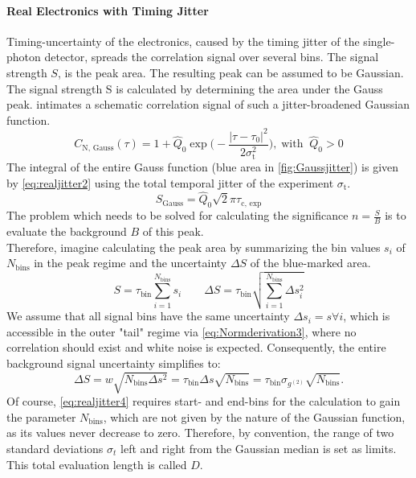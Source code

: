 \paragraph{Real Electronics with Timing Jitter}
Timing-uncertainty of the electronics, caused by the timing jitter of the single-photon detector, spreads the correlation signal over several bins. The signal strength $S$, is the peak area. The resulting peak can be assumed to be Gaussian. The signal strength S is calculated by determining the area under the Gauss peak.  intimates a schematic correlation signal of such a jitter-broadened Gaussian function.
\begin{equation}\label{eq:realjitter1}
	C_\mathrm{N,\, Gauss}(\tau) = 1+\hat{Q}_0\exp\Big(-\dfrac{|\tau-\tau_0|^2}{2\sigma^2_\mathrm{t}}\Big),\;\textrm{with}\;\;\hat{Q}_0>0
\end{equation}
The integral of the entire Gauss function (blue area in \cref{fig:Gaussjitter}) is given by \cref{eq:realjitter2} using the total temporal jitter of the experiment $\sigma_\mathrm{t}$.
\begin{equation}\label{eq:realjitter2}
	S_\mathrm{Gauss} =\hat{Q}_0\sqrt{2}\pi\tau_\mathrm{c,\, exp}
\end{equation}
The problem which needs to be solved for calculating the significance $n=\frac{S}{B}$ is to evaluate the background $B$ of this peak.\\
Therefore, imagine calculating the peak area by summarizing the bin values $s_i$ of $N_\mathrm{bins}$ in the peak regime and the uncertainty $\Delta S$ of the blue-marked area.
\begin{equation}\label{eq:realjitter3}
	S=\tau_\mathrm{bin}\sum_{i=1}^{N_\mathrm{bins}}s_i\qquad \Delta S=\tau_\mathrm{bin}\sqrt{\sum_{i=1}^{N_\mathrm{bins}}\Delta s^2_i}
\end{equation}
We assume that all signal bins have the same uncertainty $\Delta s_i = s\forall i$, which is accessible in the outer "tail" regime via \cref{eq:Normderivation3}, where no correlation should exist and white noise is expected. Consequently, the entire background signal uncertainty simplifies to:
\begin{equation}\label{eq:realjitter4}
	\Delta S=w\sqrt{N_\mathrm{bins}\Delta s^2}=\tau_\mathrm{bin}\Delta s\sqrt{N_\mathrm{bins}}=\tau_\mathrm{bin}\sigma_{g^{(2)}}\sqrt{N_\mathrm{bins}}.
\end{equation}
Of course, \cref{eq:realjitter4} requires start- and end-bins for the calculation to gain the parameter $N_\mathrm{bins}$, which are not given by the nature of the Gaussian function, as its values never decrease to zero. Therefore, by convention, the range of two standard deviations $\sigma_t$ left and right from the Gaussian median is set as limits. This total evaluation length is called $D$.
